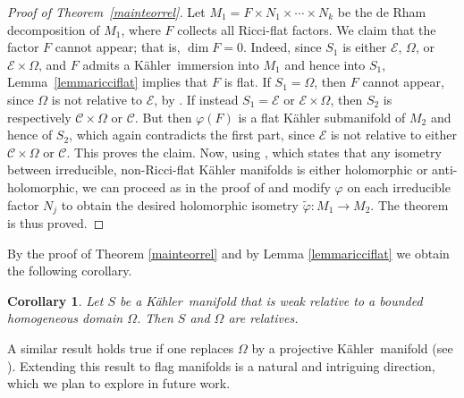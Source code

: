 \documentclass[reqno]{amsart}
\newcommand{\K}{K\"{a}hler}
\newtheorem{cor}{Corollary}
\begin{document}
\begin{proof}[Proof of Theorem~\ref{mainteorrel}]
Let $M_1 = F \times N_1 \times \cdots \times N_k$
be the de Rham decomposition of $M_1$, where $F$ collects all Ricci-flat factors. We claim that the factor $F$ cannot appear; that is, $\dim F = 0$.
Indeed, since \(S_1\) is either \(\mathcal{E}\), \(\Omega\), or \(\mathcal{E}\times\Omega\), and \(F\) admits a \K\ immersion into \(M_1\) and hence into \(S_1\), Lemma~\ref{lemmaricciflat} implies that \(F\) is flat.
If \(S_1 = \Omega\), then \(F\) cannot appear, since \(\Omega\) is not relative to \(\mathcal{E}\), by \cite{PRIMO}.  
If instead \(S_1 = \mathcal{E}\) or \(\mathcal{E} \times \Omega\), then \(S_2\) is respectively 
\(\mathcal{C} \times \Omega\) or \(\mathcal{C}\). But then \(\varphi(F)\) is a flat Kähler submanifold of \(M_2\) and hence of \(S_2\), which again contradicts the first part, since \(\mathcal{E}\) is not relative to either \(\mathcal{C} \times \Omega\) or \(\mathcal{C}\). This proves the claim.
Now, using \cite[Lemma~6]{Placini2023}, which states that any isometry between irreducible, non-Ricci-flat Kähler manifolds is either holomorphic or anti-holomorphic, we can proceed as in the proof of \cite[Thm~3]{Placini2023} and modify $\varphi$ on each irreducible factor $N_j$ to obtain the desired holomorphic isometry $\tilde\varphi \colon M_1 \to M_2$.
The theorem is thus proved.
\end{proof}

By the proof of Theorem \ref{mainteorrel} and by Lemma \ref{lemmaricciflat}
we obtain the following corollary.


\begin{cor}
Let $S$ be a \K\ manifold that is weak relative to a bounded homogeneous domain $\Omega$. Then $S$ and $\Omega$ are relatives. 
\end{cor}

A similar result holds true if one replaces $\Omega$ by a 
 projective \K\ manifold (see \cite[Th.~3]{Placini2023}). 
Extending this result to flag manifolds is a natural and intriguing direction, which we plan to explore in future work.
\end{document}
